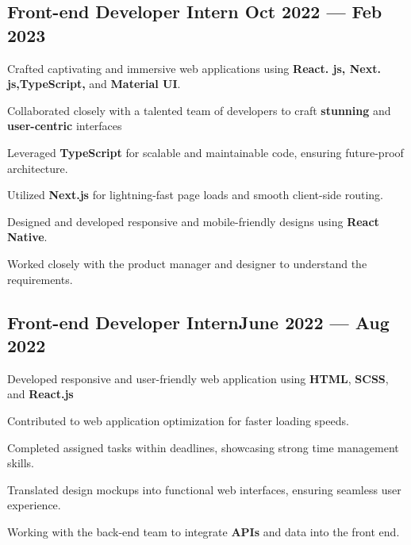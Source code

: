 

\subsection{{Front-end Developer Intern  \hfill Oct 2022 --- Feb 2023}}
\begin{zitemize}
\item Crafted captivating and immersive web applications using \textbf{React. js, Next. js,TypeScript,} and \textbf{ Material UI}.
\item Collaborated closely with a talented team of developers to craft \textbf{stunning} and \textbf{user-centric} interfaces 
\item Leveraged \textbf{TypeScript} for scalable and maintainable code, ensuring future-proof architecture.
\item Utilized \textbf{Next.js} for lightning-fast page loads and smooth client-side routing.
\item Designed and developed responsive and mobile-friendly designs using \textbf{React Native}.
\item Worked closely with the product manager and designer to understand the requirements.
\end{zitemize}


\subsection{{Front-end Developer Intern\hfill June 2022 --- Aug 2022}}
\begin{zitemize}
\item Developed responsive and user-friendly web application using \textbf{HTML}, \textbf{SCSS}, and \textbf{React.js}
\item Contributed to web application optimization for faster loading speeds.
\item Completed assigned tasks within deadlines, showcasing strong time management skills.
\item Translated design mockups into functional web interfaces, ensuring seamless user experience.
\item Working with the back-end team to integrate \textbf{APIs} and data into the front end.


\end{zitemize}
